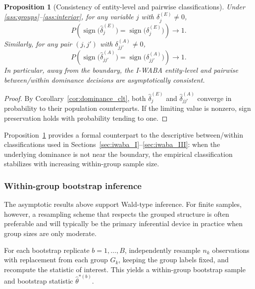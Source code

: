 \documentclass[preprint, times, 12pt, authoryear]{elsarticle}
\newtheorem{proposition}[theorem]{Proposition}
\begin{document}
\begin{proposition}[Consistency of entity-level and pairwise classifications]\label{prop:classification_consistency}
	Under \ref{ass:groups}--\ref{ass:interior}, for any variable $j$ with $\delta_j^{(E)}\neq 0$,
	\[
	P\!\left(\operatorname{sign}\bigl(\hat\delta_j^{(E)}\bigr)=\operatorname{sign}\bigl(\delta_j^{(E)}\bigr)\right)\to 1.
	\]
	Similarly, for any pair $(j,j')$ with $\delta_{jj'}^{(A)}\neq 0$,
	\[
	P\!\left(\operatorname{sign}\bigl(\hat\delta_{jj'}^{(A)}\bigr)=\operatorname{sign}\bigl(\delta_{jj'}^{(A)}\bigr)\right)\to 1.
	\]
	In particular, away from the boundary, the I-WABA entity-level and pairwise between/within dominance decisions are asymptotically consistent.
\end{proposition}

\begin{proof}
	By Corollary~\ref{cor:dominance_clt}, both $\hat\delta_j^{(E)}$ and $\hat\delta_{jj'}^{(A)}$ converge in probability to their population counterparts. If the limiting value is nonzero, sign preservation holds with probability tending to one.
\end{proof}

Proposition~\ref{prop:classification_consistency} provides a formal counterpart to the descriptive between/within classifications used in Sections~\ref{sec:iwaba_I}--\ref{sec:iwaba_III}: when the underlying dominance is not near the boundary, the empirical classification stabilizes with increasing within-group sample size.

\subsubsection{Within-group bootstrap inference}

The asymptotic results above support Wald-type inference. For finite samples, however, a resampling scheme that respects the grouped structure is often preferable and will typically be the primary inferential device in practice when group sizes are only moderate.

For each bootstrap replicate $b=1,\ldots,B$, independently resample $n_k$ observations with replacement from each group $G_k$, keeping the group labels fixed, and recompute the statistic of interest. This yields a within-group bootstrap sample and bootstrap statistic $\hat\theta^{*(b)}$.
\end{document}
